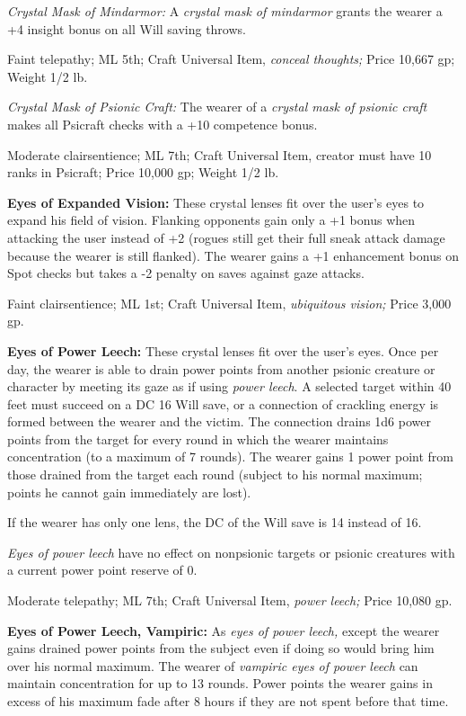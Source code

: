 \documentclass{article}
\begin{document}
\textit{Crystal Mask of Mindarmor: }A \textit{crystal mask of mindarmor }grants 
the wearer a +4 insight bonus on all Will saving throws.

Faint telepathy; ML 5th; Craft Universal Item, \textit{conceal thoughts; }Price 
10,667 gp; Weight 1/2 lb.

\textit{Crystal Mask of Psionic Craft: }The wearer of a \textit{crystal mask of 
psionic craft }makes all Psicraft checks with a +10 competence bonus.

Moderate clairsentience; ML 7th; Craft Universal Item, creator must have 10 ranks 
in Psicraft; Price 10,000 gp; Weight 1/2 lb.

\textbf{Eyes of Expanded Vision:} These crystal lenses fit over the user's eyes 
to expand his field of vision. Flanking opponents gain only a +1 bonus when attacking 
the user instead of +2 (rogues still get their full sneak attack damage because 
the wearer is still flanked). The wearer gains a +1 enhancement bonus on Spot checks 
but takes a -2 penalty on saves against gaze attacks.

Faint clairsentience; ML 1st; Craft Universal Item, \textit{ubiquitous vision; 
}Price 3,000 gp.

\textbf{Eyes of Power Leech:} These crystal lenses fit over the user's eyes. Once 
per day, the wearer is able to drain power points from another psionic creature 
or character by meeting its gaze as if using \textit{power leech}. A selected target 
within 40 feet must succeed on a DC 16 Will save, or a connection of crackling 
energy is formed between the wearer and the victim. The connection drains 1d6 power 
points from the target for every round in which the wearer maintains concentration 
(to a maximum of 7 rounds). The wearer gains 1 power point from those drained from 
the target each round (subject to his normal maximum; points he cannot gain immediately 
are lost).

If the wearer has only one lens, the DC of the Will save is 14 instead of 16.

\textit{Eyes of power leech }have no effect on nonpsionic targets or psionic creatures 
with a current power point reserve of 0.

Moderate telepathy; ML 7th; Craft Universal Item, \textit{power leech; }Price 10,080 
gp.

\textbf{Eyes of Power Leech, Vampiric:} As \textit{eyes of power leech, }except 
the wearer gains drained power points from the subject even if doing so would bring 
him over his normal maximum. The wearer of \textit{vampiric eyes of power leech 
}can maintain concentration for up to 13 rounds. Power points the wearer gains 
in excess of his maximum fade after 8 hours if they are not spent before that time.
\end{document}
